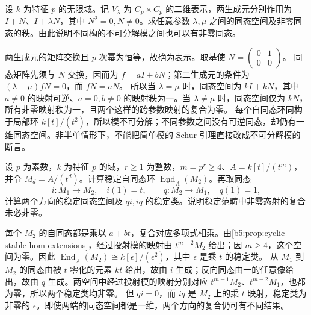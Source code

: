 \begin{optionalexercise}\label{b5:ex:08-elementary-abelian-family}
	设 \(k\) 为特征 \(p\) 的无限域。记 \(V_\lambda\) 为 \(C_p\times C_p\) 的二维表示，两生成元分别作用为 \(I+N\)、\(I+\lambda N\)，其中 \(N^2=0,N\neq0\)。求任意参数 \(\lambda,\mu\) 之间的同态空间及非零同态的秩。由此说明不同构的不可分解模之间也可以有非零同态。
\end{optionalexercise}
\begin{solution}
	两生成元的矩阵交换且 \(p\) 次幂为恒等，故确为表示。取基使
	\(N=\left(\begin{smallmatrix}0&1\\0&0\end{smallmatrix}\right)\)。
	同态矩阵先须与 \(N\) 交换，因而为 \(f=aI+bN\)；第二生成元的条件为 \((\lambda-\mu)fN=0\)，而 \(fN=aN\)。 所以当 \(\lambda=\mu\) 时，同态空间为 \(kI+kN\)，其中 \(a\neq0\) 的映射可逆、\(a=0,b\neq0\) 的映射秩为一。当 \(\lambda\neq\mu\) 时，同态空间仅为 \(kN\)，所有非零映射秩为一，且两个这样的跨参数映射的复合为零。 每个自同态环同构于局部环 \(k[t]/(t^2)\)，所以模不可分解；不同参数之间没有可逆同态，却仍有一维同态空间。非半单情形下，不能把简单模的 Schur 引理直接改成不可分解模的断言。
\end{solution}

\begin{optionalexercise}\label{b5:ex:08-hom-through-projectives}
	设 \(p\) 为素数，\(k\) 为特征 \(p\) 的域，\(r\ge1\) 为整数，\(m=p^r\ge4\)、\(A=k[t]/(t^m)\)，并令 \(M_d=A/(t^d)\)。计算稳定自同态环 \(\underline{\operatorname{End}}_A(M_2)\)。再取同态
	\[
		i:M_1\to M_2,\quad i(1)=t,\qquad q:M_2\to M_1,\quad q(1)=1,
	\]
	计算两个方向的稳定同态空间及 \(qi,iq\) 的稳定类。说明稳定范畴中非零态射的复合未必非零。
\end{optionalexercise}
\begin{solution}
	每个 \(M_2\) 的自同态都是乘以 \(a+bt\)，复合对应多项式相乘。由\cref{b5:prop:cyclic-stable-hom-extensions}，经过投射模的映射由 \(t^{m-2}M_2\) 给出；因 \(m\ge4\)，这个空间为零。因此 \(\underline{\operatorname{End}}_A(M_2)\cong k[\epsilon]/(\epsilon^2)\)，其中 \(\epsilon\) 是乘 \(t\) 的稳定类。 从 \(M_1\) 到 \(M_2\) 的同态由被 \(t\) 零化的元素 \(kt\) 给出，故由 \(i\) 生成；反向同态由一的任意像给出，故由 \(q\) 生成。两空间中经过投射模的映射分别对应 \(t^{m-1}M_2\)、\(t^{m-2}M_1\)，也都为零，所以两个稳定类均非零。 但 \(qi=0\)，而 \(iq\) 是 \(M_2\) 上的乘 \(t\) 映射，稳定类为非零的 \(\epsilon\)。即使两端的同态空间都是一维，两个方向的复合仍可有不同结果。
\end{solution}

